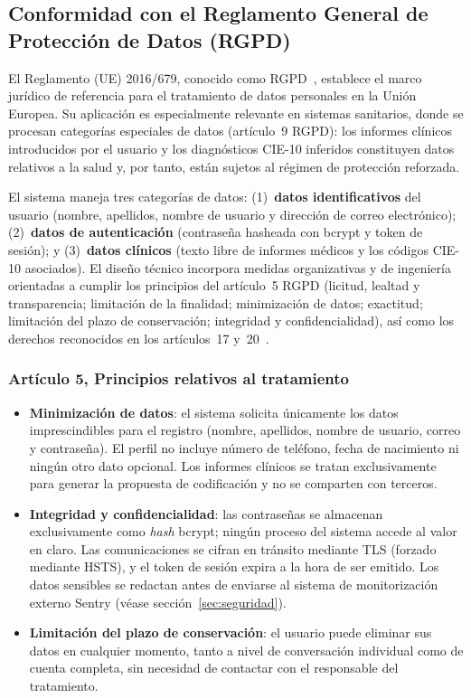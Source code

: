\subsection{Conformidad con el Reglamento General de Protección de Datos (RGPD)}
\label{sec:rgpd}

El Reglamento (UE) 2016/679, conocido como RGPD~\cite{RGPD16}, establece el marco jurídico de referencia para el tratamiento de datos personales en la Unión Europea. Su aplicación es especialmente relevante en sistemas sanitarios, donde se procesan categorías especiales de datos (artículo~9 RGPD): los informes clínicos introducidos por el usuario y los diagnósticos CIE-10 inferidos constituyen datos relativos a la salud y, por tanto, están sujetos al régimen de protección reforzada.

El sistema maneja tres categorías de datos: (1)~\textbf{datos identificativos} del usuario (nombre, apellidos, nombre de usuario y dirección de correo electrónico); (2)~\textbf{datos de autenticación} (contraseña hasheada con bcrypt y token de sesión); y (3)~\textbf{datos clínicos} (texto libre de informes médicos y los códigos CIE-10 asociados). El diseño técnico incorpora medidas organizativas y de ingeniería orientadas a cumplir los principios del artículo~5 RGPD (licitud, lealtad y transparencia; limitación de la finalidad; minimización de datos; exactitud; limitación del plazo de conservación; integridad y confidencialidad), así como los derechos reconocidos en los artículos~17 y~20~\cite{RGPD16}.

\subsubsection{Artículo 5, Principios relativos al tratamiento}

\begin{itemize}
 \item \textbf{Minimización de datos}: el sistema solicita únicamente los datos imprescindibles para el registro (nombre, apellidos, nombre de usuario, correo y contraseña). El perfil no incluye número de teléfono, fecha de nacimiento ni ningún otro dato opcional. Los informes clínicos se tratan exclusivamente para generar la propuesta de codificación y no se comparten con terceros.
 \item \textbf{Integridad y confidencialidad}: las contraseñas se almacenan exclusivamente como \emph{hash} bcrypt; ningún proceso del sistema accede al valor en claro. Las comunicaciones se cifran en tránsito mediante TLS (forzado mediante HSTS), y el token de sesión expira a la hora de ser emitido. Los datos sensibles se redactan antes de enviarse al sistema de monitorización externo Sentry (véase sección~\ref{sec:seguridad}).
 \item \textbf{Limitación del plazo de conservación}: el usuario puede eliminar sus datos en cualquier momento, tanto a nivel de conversación individual como de cuenta completa, sin necesidad de contactar con el responsable del tratamiento.
\end{itemize}

